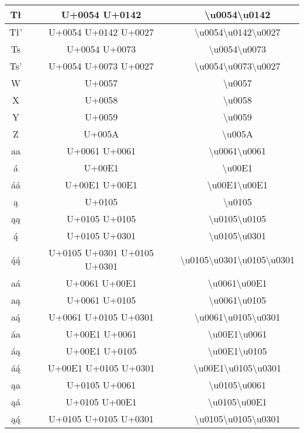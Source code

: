 \begin{longtable}{|c|c|c|}
Tł & U+0054 U+0142 & \textbackslash{}u0054\textbackslash{}u0142 \\ \hline
Tł' & U+0054 U+0142 U+0027 & \textbackslash{}u0054\textbackslash{}u0142\textbackslash{}u0027 \\ \hline
Ts & U+0054 U+0073 & \textbackslash{}u0054\textbackslash{}u0073 \\ \hline
Ts' & U+0054 U+0073 U+0027 & \textbackslash{}u0054\textbackslash{}u0073\textbackslash{}u0027 \\ \hline
W & U+0057 & \textbackslash{}u0057 \\ \hline
X & U+0058 & \textbackslash{}u0058 \\ \hline
Y & U+0059 & \textbackslash{}u0059 \\ \hline
Z & U+005A & \textbackslash{}u005A \\ \hline

aa & U+0061 U+0061 & \textbackslash{}u0061\textbackslash{}u0061 \\ \hline
á & U+00E1 & \textbackslash{}u00E1 \\ \hline
áá & U+00E1 U+00E1 & \textbackslash{}u00E1\textbackslash{}u00E1 \\ \hline
ą & U+0105 & \textbackslash{}u0105 \\ \hline
ąą & U+0105 U+0105 & \textbackslash{}u0105\textbackslash{}u0105 \\ \hline
ą́ & U+0105 U+0301 & \textbackslash{}u0105\textbackslash{}u0301 \\ \hline
ą́ą́ & U+0105 U+0301 U+0105 U+0301 & \textbackslash{}u0105\textbackslash{}u0301\textbackslash{}u0105\textbackslash{}u0301 \\ \hline

aá & U+0061 U+00E1 & \textbackslash{}u0061\textbackslash{}u00E1 \\ \hline
aą & U+0061 U+0105 & \textbackslash{}u0061\textbackslash{}u0105 \\ \hline
aą́ & U+0061 U+0105 U+0301 & \textbackslash{}u0061\textbackslash{}u0105\textbackslash{}u0301 \\ \hline

áa & U+00E1 U+0061  & \textbackslash{}u00E1\textbackslash{}u0061 \\ \hline
áą & U+00E1 U+0105 & \textbackslash{}u00E1\textbackslash{}u0105 \\ \hline
áą́ & U+00E1 U+0105 U+0301 & \textbackslash{}u00E1\textbackslash{}u0105\textbackslash{}u0301 \\ \hline

ąa & U+0105 U+0061  & \textbackslash{}u0105\textbackslash{}u0061 \\ \hline
ąá & U+0105 U+00E1 & \textbackslash{}u0105\textbackslash{}u00E1 \\ \hline
ąą́ & U+0105 U+0105 U+0301  & \textbackslash{}u0105\textbackslash{}u0105\textbackslash{}u0301 \\ \hline


\end{longtable}
